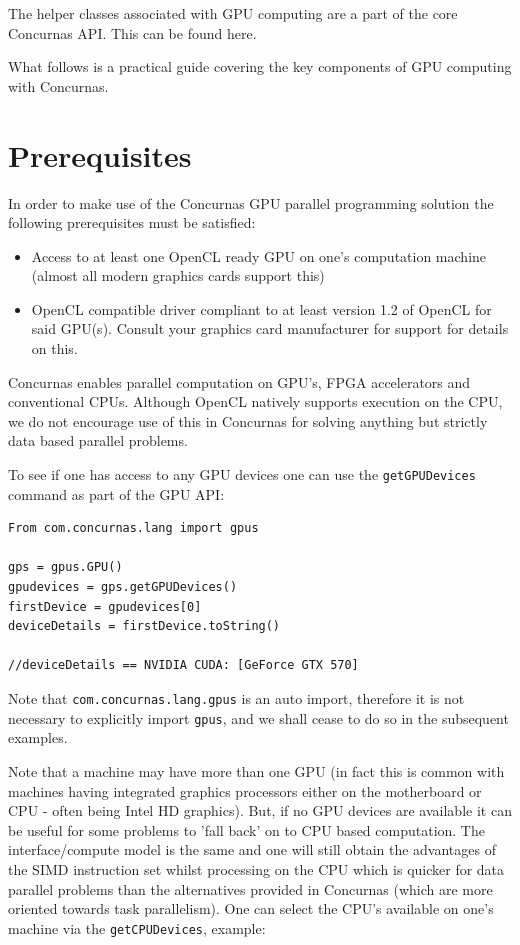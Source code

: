 \documentclass[conc-doc]{subfiles}
\begin{document}
The helper classes associated with GPU computing are a part of the core Concurnas API. This can be found here.

What follows is a practical guide covering the key components of GPU computing with Concurnas.

\section{Prerequisites}
In order to make use of the Concurnas GPU parallel programming solution the following prerequisites must be satisfied:

\begin{itemize}
	\item Access to at least one OpenCL ready GPU on one's computation machine (almost all modern graphics cards support this)
	\item OpenCL compatible driver compliant to at least version 1.2 of OpenCL for said GPU(s). Consult your graphics card manufacturer for support for details on this.
\end{itemize}


Concurnas enables parallel computation on GPU's, FPGA accelerators and conventional CPUs. Although OpenCL natively supports execution on the CPU, we do not encourage use of this in Concurnas for solving anything but strictly data based parallel problems.

To see if one has access to any GPU devices one can use the \lstinline{getGPUDevices} command as part of the GPU API:

\begin{lstlisting}
From com.concurnas.lang import gpus

gps = gpus.GPU()
gpudevices = gps.getGPUDevices()
firstDevice = gpudevices[0]
deviceDetails = firstDevice.toString()

//deviceDetails == NVIDIA CUDA: [GeForce GTX 570]
\end{lstlisting}

Note that \lstinline{com.concurnas.lang.gpus} is an auto import, therefore it is not necessary to explicitly import \lstinline{gpus}, and we shall cease to do so in the subsequent examples.

Note that a machine may have more than one GPU (in fact this is common with machines having integrated graphics processors either on the motherboard or CPU - often being Intel HD graphics). But, if no GPU devices are available it can be useful for some problems to 'fall back' on to CPU based computation. The interface/compute model is the same and one will still obtain the advantages of the SIMD instruction set whilst processing on the CPU which is quicker for data parallel problems than the alternatives provided in Concurnas (which are more oriented towards task parallelism). One can select the CPU's available on one's machine via the \lstinline{getCPUDevices}, example:
\end{document}

